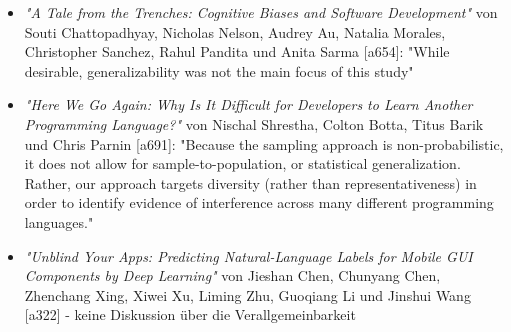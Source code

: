 \begin{itemize}
    \item \textit{"A Tale from the Trenches: Cognitive Biases and Software Development"} von Souti Chattopadhyay, Nicholas Nelson, Audrey Au, Natalia Morales, Christopher Sanchez, Rahul Pandita und Anita Sarma [a654]: "While desirable, generalizability was not the main focus of this study"
    \item \textit{"Here We Go Again: Why Is It Difficult for Developers to Learn Another Programming Language?"} von Nischal Shrestha, Colton Botta, Titus Barik und Chris Parnin [a691]: "Because the sampling approach is non-probabilistic, it does not allow for sample-to-population, or statistical generalization. Rather, our approach targets diversity (rather than representativeness) in order to identify evidence of interference across many different programming languages."
    \item \textit{"Unblind Your Apps: Predicting Natural-Language Labels for Mobile GUI Components by Deep Learning"} von Jieshan Chen, Chunyang Chen, Zhenchang Xing, Xiwei Xu, Liming Zhu, Guoqiang Li und Jinshui Wang [a322] - keine Diskussion über die Verallgemeinbarkeit
\end{itemize}
